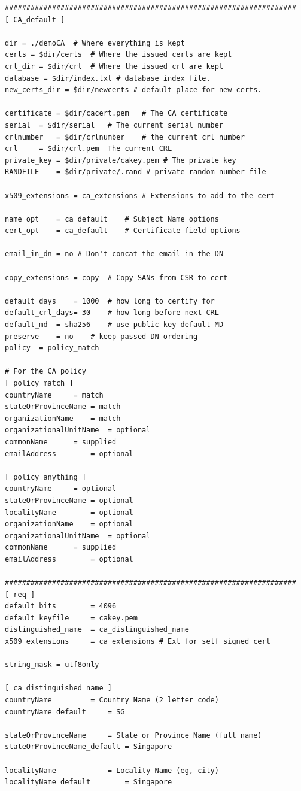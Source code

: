 \documentclass[a4paper,12pt]{article}
\begin{document}
{{\begin{verbatim}
####################################################################
[ CA_default ]

dir	= ./demoCA	# Where everything is kept
certs = $dir/certs	# Where the issued certs are kept
crl_dir	= $dir/crl	# Where the issued crl are kept
database = $dir/index.txt # database index file.
new_certs_dir = $dir/newcerts # default place for new certs.

certificate	= $dir/cacert.pem 	# The CA certificate
serial	= $dir/serial 	# The current serial number
crlnumber	= $dir/crlnumber	# the current crl number
crl		= $dir/crl.pem	The current CRL
private_key	= $dir/private/cakey.pem # The private key
RANDFILE	= $dir/private/.rand # private random number file

x509_extensions = ca_extensions # Extensions to add to the cert

name_opt 	= ca_default	# Subject Name options
cert_opt 	= ca_default	# Certificate field options

email_in_dn = no # Don't concat the email in the DN

copy_extensions = copy	# Copy SANs from CSR to cert

default_days    = 1000	# how long to certify for
default_crl_days= 30	# how long before next CRL
default_md  = sha256	# use public key default MD
preserve    = no	# keep passed DN ordering
policy	= policy_match

# For the CA policy
[ policy_match ]
countryName		= match
stateOrProvinceName	= match
organizationName	= match
organizationalUnitName	= optional
commonName		= supplied
emailAddress		= optional

[ policy_anything ]
countryName		= optional
stateOrProvinceName	= optional
localityName		= optional
organizationName	= optional
organizationalUnitName	= optional
commonName		= supplied
emailAddress		= optional

####################################################################
[ req ]
default_bits        = 4096
default_keyfile     = cakey.pem
distinguished_name  = ca_distinguished_name
x509_extensions     = ca_extensions	# Ext for self signed cert

string_mask = utf8only

[ ca_distinguished_name ]
countryName         = Country Name (2 letter code)
countryName_default     = SG

stateOrProvinceName     = State or Province Name (full name)
stateOrProvinceName_default = Singapore

localityName            = Locality Name (eg, city)
localityName_default        = Singapore


\end{verbatim}}}
\end{document}
